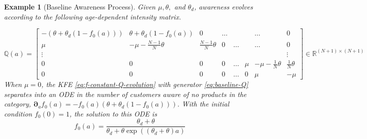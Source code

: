 \documentclass[12pt]{article}
\newtheorem{example}{Example}
\newcommand{\R}{\ensuremath{\mathbb{R}}}
\newcommand{\Q}[0]{\ensuremath{\mathbb{Q}}}
\newcommand{\D}[1][]{\ensuremath{\boldsymbol{\partial}_{#1}}}
\begin{document}
\begin{example}[Baseline Awareness Process]\label{example:bass-style}
	Given $\mu,\theta,$ and $\theta_d$, awareness evolves according to the following age-dependent intensity matrix.
	
	\begin{equation}
	\Q(a) = \left[\begin{smallmatrix}
	-\left(\theta + \theta_d (1 - f_0(a))\right) & \theta + \theta_d (1 - f_0(a)) & 0 & \ldots & & & \ldots & 0\\
	\mu  & -\mu - \tfrac{N-1}{N}\theta & \tfrac{N-1}{N}\theta & 0 & \ldots & & \ldots & 0\\
	\vdots & & & & & & & \vdots\\ %
	0 & 0 & 0 & 0 & \ldots &\mu & -\mu -\tfrac{1}{N}\theta & \tfrac{1}{N}\theta\\
	0 & 0 & 0 & 0 & \ldots & 0 & \mu & -\mu
	\end{smallmatrix}\right]\in \R^{(N+1)\times(N+1)}\label{eq:baseline-Q}
	\end{equation}
	When $\mu=0$, the KFE \cref{eq:f-constant-Q-evolution} with generator \cref{eq:baseline-Q} separates into an ODE in the number of customers aware of no products in the category, $\D[a] f_0(a) = -f_0(a)\left(\theta + \theta_d (1 - f_0(a))\right)$.  With the initial condition $f_0(0) = 1$, the solution to this ODE is
	\begin{equation}
	f_0(a) = \frac{\theta_d + \theta}{\theta_d + \theta \exp\left((\theta_d + \theta )a\right)}
	\end{equation}
	\end{example}
\end{document}
